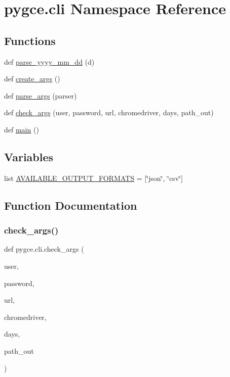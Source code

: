 \hypertarget{namespacepygce_1_1cli}{}\section{pygce.\+cli Namespace Reference}
\label{namespacepygce_1_1cli}
\subsection*{Functions}
\begin{DoxyCompactItemize}
\item 
def \hyperlink{namespacepygce_1_1cli_a807a6becfdbbb6dab4fede7208861afc}{parse\+\_\+yyyy\+\_\+mm\+\_\+dd} (d)
\item 
def \hyperlink{namespacepygce_1_1cli_a5734100556cffce34b4b53f9d027080b}{create\+\_\+args} ()
\item 
def \hyperlink{namespacepygce_1_1cli_a7729e758c25a70a57c0578bd4dde32df}{parse\+\_\+args} (parser)
\item 
def \hyperlink{namespacepygce_1_1cli_ae7af99f151402a9303ad2086f3d308b7}{check\+\_\+args} (user, password, url, chromedriver, days, path\+\_\+out)
\item 
def \hyperlink{namespacepygce_1_1cli_a696dc9e135d9815a0d4a889eb94c18fb}{main} ()
\end{DoxyCompactItemize}
\subsection*{Variables}
\begin{DoxyCompactItemize}
\item 
list \hyperlink{namespacepygce_1_1cli_a13e8047ab788ce64d94c1077ad4218e5}{A\+V\+A\+I\+L\+A\+B\+L\+E\+\_\+\+O\+U\+T\+P\+U\+T\+\_\+\+F\+O\+R\+M\+A\+TS} = \mbox{[}\char`\"{}json\char`\"{}, \char`\"{}csv\char`\"{}\mbox{]}
\end{DoxyCompactItemize}


\subsection{Function Documentation}
\mbox{\label{namespacepygce_1_1cli_ae7af99f151402a9303ad2086f3d308b7}} 
\subsubsection{\texorpdfstring{check\+\_\+args()}{check\_args()}}
{\footnotesize\ttfamily def pygce.\+cli.\+check\+\_\+args (\begin{DoxyParamCaption}\item[{}]{user,  }\item[{}]{password,  }\item[{}]{url,  }\item[{}]{chromedriver,  }\item[{}]{days,  }\item[{}]{path\+\_\+out }\end{DoxyParamCaption})}

